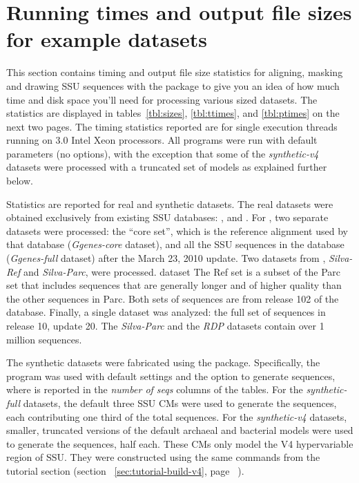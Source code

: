 \section{Running times and output file sizes for example datasets}
\label{sec:stats}

This section contains timing and output file size statistics for
aligning, masking and drawing SSU sequences with the 
package to give you an idea of how much time and disk space you'll
need for processing various sized datasets.  The statistics are
displayed in tables~\ref{tbl:sizes}, \ref{tbl:ttimes}, and
\ref{tbl:ptimes} on the next two pages. The timing statistics reported
are for single execution threads running on 3.0 Intel Xeon
processors. All programs were run with default parameters (no
options), with the exception that some of the \emph{synthetic-v4} datasets
were processed with a truncated set of models as explained further
below.

%

Statistics are reported for real and synthetic datasets. The real
datasets were obtained exclusively from existing SSU databases:
 \cite{DeSantis06a}, 
\cite{Pruesse07} and  \cite{Cole09}. For ,
two separate datasets were processed: the ``core set'', which is the
reference alignment used by that database (\emph{Ggenes-core}
dataset), and all the SSU sequences in the database
(\emph{Ggenes-full} dataset) after the March 23, 2010 update. Two
datasets from , \emph{Silva-Ref} and \emph{Silva-Parc}, were
processed. dataset The Ref set is a subset of the Parc
set that includes sequences that are generally longer and of higher
quality than the other sequences in Parc. Both sets of sequences are
from release 102 of the database. Finally, a single  dataset
was analyzed: the full set of sequences in release 10, update 20. The
\emph{Silva-Parc} and the \emph{RDP} datasets contain over 1 million
sequences.

The synthetic datasets were fabricated using the 
package. Specifically, the  program was used with default
settings and the  option to generate 
sequences, where  is reported in the \emph{number of seqs}
columns of the tables. For the \emph{synthetic-full} datasets, the
default three  SSU CMs were used to generate the
sequences, each contributing one third of the total sequences. For the
\emph{synthetic-v4} datasets, smaller, truncated versions of the default
archaeal and bacterial models were used to generate the sequences,
half each. These CMs only model the V4 hypervariable region of
SSU. They were constructed using the same  commands
from the tutorial section (section
~\ref{sec:tutorial-build-v4}, page ~\pageref{sec:tutorial-build-v4}).

